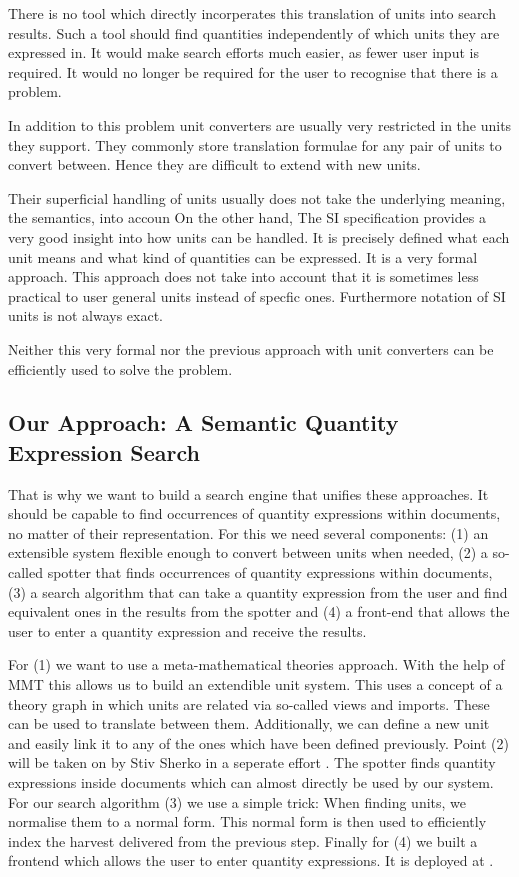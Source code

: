 There is no tool which directly incorperates this translation of units into search results. Such a tool should find quantities independently of which units they are expressed in. It would make search efforts much easier, as fewer user input is required. It would no longer be required for the user to recognise that there is a problem.

In addition to this problem unit converters are usually very restricted in the units they support. They commonly store translation formulae for any pair of units to convert between. Hence they are difficult to extend with new units.

Their superficial handling of units usually does not take the underlying meaning, the semantics, into accoun On the other hand, The SI specification \cite{sispec} provides a very good insight into how units can be handled. It is precisely defined what each unit means and what kind of quantities can be expressed. It is a very formal approach. This approach does not take into account that it is sometimes less practical to user general units instead of specfic ones. Furthermore notation of SI units is not always exact.

Neither this very formal nor the previous approach with unit converters can be efficiently used to solve the problem.

\subsection{Our Approach: A Semantic Quantity Expression Search}

That is why we want to build a search engine that unifies these approaches. It should be capable to find occurrences of quantity expressions within documents, no matter of their representation. For this we need several components: (1) an extensible system flexible enough to convert between units when needed, (2) a so-called spotter that finds occurrences of quantity expressions within documents, (3) a search algorithm that can take a quantity expression from the user and find equivalent ones in the results from the spotter and (4) a front-end that allows the user to enter a quantity expression and receive the results.

For (1) we want to use a meta-mathematical theories approach. With the help of MMT this allows us to build an extendible unit system. This uses a concept of a theory graph in which units are related via so-called views and imports. These can be used to translate between them. Additionally, we can define a new unit and easily link it to any of the ones which have been defined previously. Point (2) will be taken on by Stiv Sherko in a seperate effort \cite{proposal:sharko}. The spotter finds quantity expressions inside documents which can almost directly be used by our system. For our search algorithm (3) we use a simple trick: When finding units, we normalise them to a normal form. This normal form is then used to efficiently index the harvest delivered from the previous step. Finally for (4) we built a frontend which allows the user to enter quantity expressions. It is deployed at .

